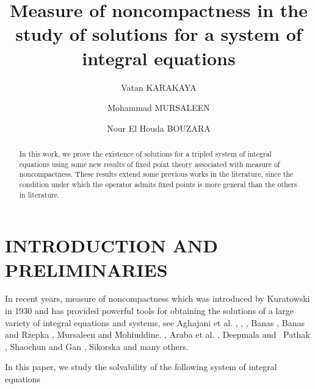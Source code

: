 \documentclass{amsart}
\theoremstyle{plain}
\numberwithin{equation}{section}
\begin{document}
\title[existence of solutions of integral system]{Measure of noncompactness
in the study of solutions for a system of integral equations}
\author{Vatan KARAKAYA}
\address{Department of Mathematical Engineering, Faculty of
Chemistry-Metallurgical, Yildiz Technical University, Istanbul, Turkey }
\author{Mohammad MURSALEEN}
\address{Department of Mathematics, Aligarh Muslim University, Aligarh
202002, India }
\author{Nour El Houda BOUZARA}
\address{Department of Mathematics, Faculty of Science and Letters, Yildiz
Technical University, Istanbul, Turkey }

\begin{abstract}
In this work, we prove the existence of solutions for a tripled system of
integral equations using some new results of fixed point theory associated
with measure of noncompactness. These results extend some previous works in
the literature, since the condition under which the operator admits fixed
points is more general than the others in literature.
\end{abstract}

\maketitle

\section{INTRODUCTION AND PRELIMINARIES}

In recent years, measure of noncompactness which was introduced by
Kuratowski \cite{kuratovski} in 1930 and has provided powerful tools for
obtaining the solutions of a large variety of integral equations and
systems, see Aghajani et al. \cite{Aghajani11}, \cite{Aghajani2}, \cite{Aghajanicoupled}, Banas \cite{banas1}, Banas and Rzepka \cite{banas3},
Mursaleen and Mohiuddine. \cite{murs}, Araba et al. \cite{reza}, Deepmala
and \ Pathak \cite{deepmala}, Shaochun and Gan \cite{Shaochun}, Sikorska 
\cite{sikorska} and many others.

In this paper, we study the solvability of the following system of integral
equations
\end{document}
